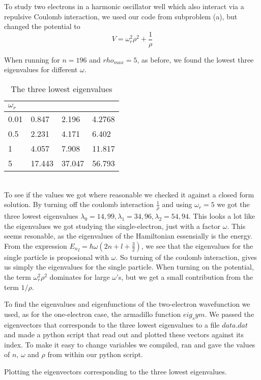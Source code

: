 \documentclass[a4paper,12pt, english]{article}
\begin{document}
To study two electrons in a harmonic oscillator well which also interact via a repulsive Coulomb interaction, we used our code from subproblem (a), but changed the potential to $$V = \omega_r^2 \rho^2 + \frac{1}{\rho} $$


When running for $n=196$ and $rho_{max} = 5$, as before, we found the lowest three eigenvalues for different $\omega.$
\\

 
\begin{table} 
\caption{The three lowest eigenvalues}
\centering
\begin{tabular}{l | l l l}
\hline
$\omega_r$ & & &\\
\hline
0.01 & 0.847 & 2.196 & 4.2768   \\ [0.5ex]
0.5 & 2.231 & 4.171 & 6.402 \\
1 & 4.057 & 7.908 & 11.817\\
5 & 17.443 & 37.047 & 56.793
\end{tabular}
\end{table}

\\

To see if the values we got where reasonable we checked it against a closed form solution. By turning off the coulomb interaction $\frac{1}{\rho}$ and using $\omega_r = 5$ we got the three lowest eigenvalues $\lambda_0 = 14,99, \lambda_1 = 34,96, \lambda_2 = 54,94$. This looks a lot like the eigenvalues we got studying the single-electron, just with a factor $\omega$. 
This seems resonable, as the eigenvalues of the Hamiltonian essensially is the energy. From the expression ${E_n}_l = \hbar\omega(2n + l + \frac{3}{2})$, we see that the eigenvalues for the single particle is proposional with $\omega$. So turning of the coulomb interaction, gives us simply the eigenvalues for the single particle. 
When turning on the potential, the term $\omega_r^2\rho^2$ dominates for large $\omega$'s, but we get a small contribution from the term $ 1/ \rho$.

To find the eigenvalues and eigenfunctions of the two-electron wavefunction we used, as for the one-electron case, the armadillo function $eig_sym$. We passed the eigenvectors that corresponds to the three lowest eigenvalues to a file $data.dat$ and made a python script that read out and plotted these vectors against its index. To make it easy to change variables we compiled, ran and gave the values of $n$, $\omega$ and $\rho$ from within our python script.    


Plotting the eigenvectors corresponding to the three lowest eigenvalues.\\
\end{document}
